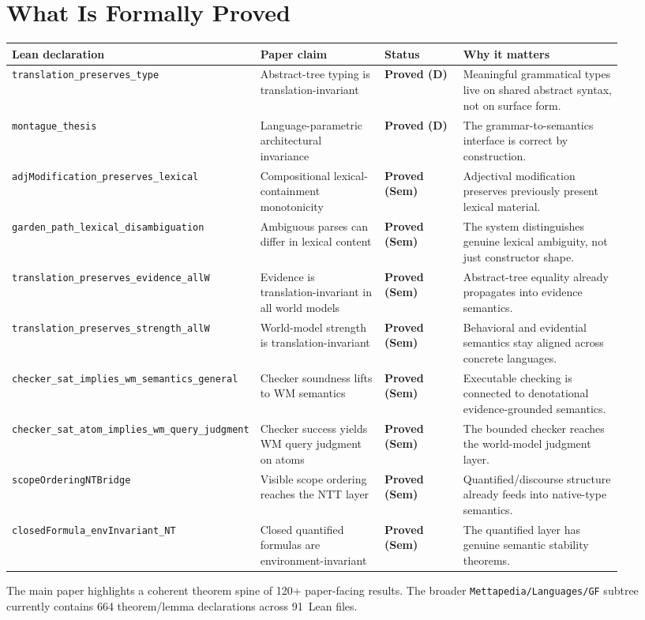 \documentclass[11pt]{article}
\newcommand{\code}[1]{\texttt{#1}}
\newcommand{\NTT}{\textup{NTT}}
\begin{document}
\section*{What Is Formally Proved}
\begin{center}
\small
\begin{tabular}{@{}p{0.26\linewidth}p{0.22\linewidth}p{0.14\linewidth}p{0.28\linewidth}@{}}
\toprule
\textbf{Lean declaration} & \textbf{Paper claim} & \textbf{Status} & \textbf{Why it matters} \\
\midrule
\code{translation\_preserves\_type} &
Abstract-tree typing is translation-invariant &
\textbf{Proved (D)} &
Meaningful grammatical types live on shared abstract syntax, not on surface form. \\
\code{montague\_thesis} &
Language-parametric architectural invariance &
\textbf{Proved (D)} &
The grammar-to-semantics interface is correct by construction. \\
\code{adjModification\_preserves\_lexical} &
Compositional lexical-containment monotonicity &
\textbf{Proved (Sem)} &
Adjectival modification preserves previously present lexical material. \\
\code{garden\_path\_lexical\_disambiguation} &
Ambiguous parses can differ in lexical content &
\textbf{Proved (Sem)} &
The system distinguishes genuine lexical ambiguity, not just constructor shape. \\
\code{translation\_preserves\_evidence\_allW} &
Evidence is translation-invariant in all world models &
\textbf{Proved (Sem)} &
Abstract-tree equality already propagates into evidence semantics. \\
\code{translation\_preserves\_strength\_allW} &
World-model strength is translation-invariant &
\textbf{Proved (Sem)} &
Behavioral and evidential semantics stay aligned across concrete languages. \\
\code{checker\_sat\_implies\_wm\_semantics\_general} &
Checker soundness lifts to WM semantics &
\textbf{Proved (Sem)} &
Executable checking is connected to denotational evidence-grounded semantics. \\
\code{checker\_sat\_atom\_implies\_wm\_query\_judgment} &
Checker success yields WM query judgment on atoms &
\textbf{Proved (Sem)} &
The bounded checker reaches the world-model judgment layer. \\
\code{scopeOrderingNTBridge} &
Visible scope ordering reaches the \NTT{} layer &
\textbf{Proved (Sem)} &
Quantified/discourse structure already feeds into native-type semantics. \\
\code{closedFormula\_envInvariant\_NT} &
Closed quantified formulas are environment-invariant &
\textbf{Proved (Sem)} &
The quantified layer has genuine semantic stability theorems. \\
\bottomrule
\end{tabular}
\end{center}
\noindent
The main paper highlights a coherent theorem spine of 120+ paper-facing results.
The broader \code{Mettapedia/Languages/GF} subtree currently contains 664
theorem/lemma declarations across 91~Lean files.
\end{document}
